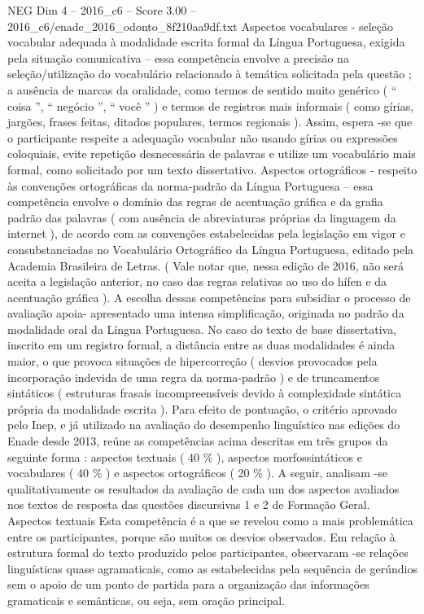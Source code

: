 \begin{textsample}{NEG Dim 4 – 2016\_c6 – Score 3.00 – 2016\_c6/enade\_2016\_odonto\_8f210aa9df.txt}
Aspectos vocabulares - seleção vocabular adequada à modalidade escrita formal da Língua Portuguesa, exigida pela situação comunicativa – essa competência envolve a precisão na seleção/utilização do vocabulário relacionado à temática solicitada pela questão ; a ausência de marcas da oralidade, como termos de sentido muito genérico ( “ coisa ”, “ negócio ”, “ você ” ) e termos de registros mais informais ( como gírias, jargões, frases feitas, ditados populares, termos regionais ).
Assim, espera -se que o participante respeite a adequação vocabular não usando gírias ou expressões coloquiais, evite repetição desnecessária de palavras e utilize um vocabulário mais formal, como solicitado por um texto dissertativo.
Aspectos ortográficos - respeito às convenções ortográficas da norma-padrão da Língua Portuguesa – essa competência envolve o domínio das regras de acentuação gráfica e da grafia padrão das palavras ( com ausência de abreviaturas próprias da linguagem da internet ), de acordo com as convenções estabelecidas pela legislação em vigor e consubstanciadas no Vocabulário Ortográfico da Língua Portuguesa, editado pela Academia Brasileira de Letras. ( Vale notar que, nessa edição de 2016, não será aceita a legislação anterior, no caso das regras relativas ao uso do hífen e da acentuação gráfica ).
A escolha dessas competências para subsidiar o processo de avaliação apoia- apresentado uma intensa simplificação, originada no padrão da modalidade oral da Língua Portuguesa.
No caso do texto de base dissertativa, inscrito em um registro formal, a distância entre as duas modalidades é ainda maior, o que provoca situações de hipercorreção ( desvios provocados pela incorporação indevida de uma regra da norma-padrão ) e de truncamentos sintáticos ( estruturas frasais incompreensíveis devido à complexidade sintática própria da modalidade escrita ).
Para efeito de pontuação, o critério aprovado pelo Inep, e já utilizado na avaliação do desempenho linguístico nas edições do Enade desde 2013, reúne as competências acima descritas em três grupos da seguinte forma : aspectos textuais ( 40 \% ), aspectos morfossintáticos e vocabulares ( 40 \% ) e aspectos ortográficos ( 20 \% ).
A seguir, analisam -se qualitativamente os resultados da avaliação de cada um dos aspectos avaliados nos textos de resposta das questões discursivas 1 e 2 de Formação Geral.
Aspectos textuais Esta competência é a que se revelou como a mais problemática entre os participantes, porque são muitos os desvios observados.
Em relação à estrutura formal do texto produzido pelos participantes, observaram -se relações linguísticas quase agramaticais, como as estabelecidas pela sequência de gerúndios sem o apoio de um ponto de partida para a organização das informações gramaticais e semânticas, ou seja, sem oração principal.

\end{textsample}
